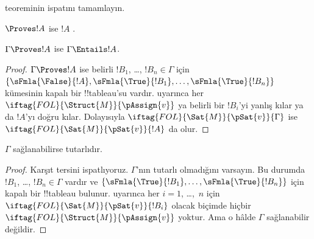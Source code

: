 \begin{prob}
 teoreminin ispatını tamamlayın.
\end{prob}
\tagendprob

\begin{cor}
$\Proves !A$ ise $!A$ .
\end{cor}

\begin{cor}
$\Gamma \Proves !A$ ise $\Gamma \Entails !A$.
\end{cor}

\begin{proof}
  $\Gamma \Proves !A$ ise belirli $!B_1$, \dots, $!B_n \in \Gamma$ için
  $\{\sFmla{\False}{!A}, \sFmla{\True}{!B_1}, \dots,
  \sFmla{\True}{!B_n}\}$ kümesinin kapalı bir !!{tableau}'su vardır.
   uyarınca her
  ~$\iftag{FOL}{\Struct{M}}{\pAssign{v}}$
  ya belirli bir $!B_i$'yi yanlış kılar ya da $!A$'yı doğru kılar. Dolayısıyla
  $\iftag{FOL}{\Sat{M}}{\pSat{v}}{\Gamma}$ ise
  $\iftag{FOL}{\Sat{M}}{\pSat{v}}{!A}$ da olur.
\end{proof}

\begin{cor}
$\Gamma$ sağlanabilirse tutarlıdır.
\end{cor}

\begin{proof}
Karşıt tersini ispatlıyoruz. $\Gamma$'nın tutarlı olmadığını varsayın. Bu
durumda $!B_1$, \dots, $!B_n \in \Gamma$ vardır ve
$\{\sFmla{\True}{!B_1}, \dots, \sFmla{\True}{!B_n}\}$ için kapalı bir
!!{tableau} bulunur.  uyarınca her
$i=1$, \dots,~$n$ için $\iftag{FOL}{\Sat{M}}{\pSat{v}}{!B_i}$ olacak
biçimde hiçbir $\iftag{FOL}{\Struct{M}}{\pAssign{v}}$ yoktur. Ama o hâlde
$\Gamma$ sağlanabilir değildir.
\end{proof}

